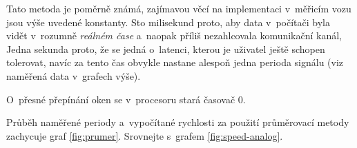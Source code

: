 Tato metoda je poměrně známá, zajímavou věcí na implementaci v~měřicím vozu
jsou výše uvedené konstanty. Sto milisekund proto, aby data v~počítači byla
vidět v~rozumně \textit{reálném čase} a~naopak příliš nezahlcovala komunikační
kanál, Jedna sekunda proto, že se jedná o~latenci, kterou je uživatel ještě
schopen tolerovat, navíc za tento čas obvykle nastane alespoň jedna perioda
signálu (viz naměřená data v~grafech výše).

O~přesné přepínání oken se v~procesoru stará časovač 0.

Průběh naměřené periody a~vypočítané rychlosti za použití průměrovací metody
zachycuje graf \ref{fig:prumer}. Srovnejte s~grafem \ref{fig:speed-analog}.
